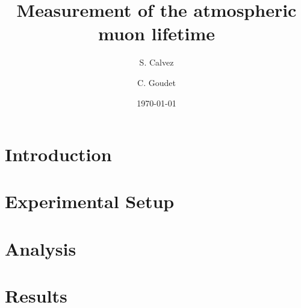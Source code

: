 \documentclass[final,twoside,twocolumn,10pt]{article}
\begin{document}
%
\title{Measurement of the atmospheric muon lifetime}
\author{S. Calvez \and C. Goudet}
%
\date{\today}

\maketitle
%
\begin{abstract}

\end{abstract}

\section{Introduction}



\section{Experimental Setup}


\section{Analysis}


\section{Results}

\end{document}
